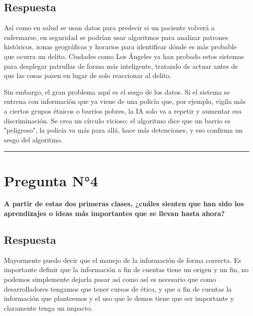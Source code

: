 \documentclass[12pt,a4paper]{article}
\begin{document}
\subsection*{Respuesta}
Así como en salud se usan datos para predecir si un paciente volverá a enfermarse, en seguridad se podrían usar algoritmos para analizar patrones históricos, zonas geográficas y horarios para identificar dónde es más probable que ocurra un delito. Ciudades como Los Ángeles ya han probado estos sistemas para desplegar patrullas de forma más inteligente, tratando de actuar antes de que las cosas pasen en lugar de solo reaccionar al delito.

Sin embargo, el gran problema aquí es el sesgo de los datos. Si el sistema se entrena con información que ya viene de una policía que, por ejemplo, vigila más a ciertos grupos étnicos o barrios pobres, la IA solo va a repetir y aumentar esa discriminación. Se crea un círculo vicioso: el algoritmo dice que un barrio es "peligroso", la policía va más para allá, hace más detenciones, y eso confirma un sesgo del algoritmo.

\vspace{0.5cm}
\hrule
\vspace{0.5cm}

\section*{Pregunta N°4}
\textbf{A partir de estas dos primeras clases, ¿cuáles sienten que han sido los aprendizajes o ideas más importantes que se llevan hasta ahora?}

\subsection*{Respuesta}

Mayormente puedo decir que el manejo de la información de forma correcta. Es importante definir que la información a fin de cuentas tiene un origen y un fin, no podemos simplemente dejarla pasar así como así es necesario que como desarrolladores tengamos que tener cursos de ética, y que a fin de cuentas la información que planteemos y el uso que le demos tiene que ser importante y claramente tenga un impacto.
\end{document}
